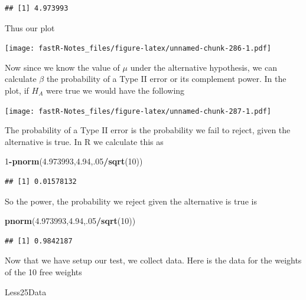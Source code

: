 \documentclass[]{book}
\newenvironment{Shaded}{\begin{snugshade}}{\end{snugshade}}
\newcommand{\KeywordTok}[1]{\textcolor[rgb]{0.13,0.29,0.53}{\textbf{#1}}}
\newcommand{\DecValTok}[1]{\textcolor[rgb]{0.00,0.00,0.81}{#1}}
\newcommand{\FloatTok}[1]{\textcolor[rgb]{0.00,0.00,0.81}{#1}}
\newcommand{\OperatorTok}[1]{\textcolor[rgb]{0.81,0.36,0.00}{\textbf{#1}}}
\newcommand{\NormalTok}[1]{#1}
\theoremstyle{definition}
\theoremstyle{definition}
\theoremstyle{definition}
\theoremstyle{remark}
\begin{document}
\begin{verbatim}
## [1] 4.973993
\end{verbatim}

Thus our plot

\texttt{[image: fastR-Notes\_files/figure-latex/unnamed-chunk-286-1.pdf]}

Now since we know the value of \(\mu\) under the alternative hypothesis,
we can calculate \(\beta\) the probability of a Type II error or its
complement power. In the plot, if \(H_{A}\) were true we would have the
following

\texttt{[image: fastR-Notes\_files/figure-latex/unnamed-chunk-287-1.pdf]}

The probability of a Type II error is the probability we fail to reject,
given the alternative is true. In R we calculate this as

\begin{Shaded}
\begin{Highlighting}[]
\DecValTok{1}\OperatorTok{-}\KeywordTok{pnorm}\NormalTok{(}\FloatTok{4.973993}\NormalTok{,}\FloatTok{4.94}\NormalTok{,.}\DecValTok{05}\OperatorTok{/}\KeywordTok{sqrt}\NormalTok{(}\DecValTok{10}\NormalTok{))}
\end{Highlighting}
\end{Shaded}

\begin{verbatim}
## [1] 0.01578132
\end{verbatim}

So the power, the probability we reject given the alternative is true is

\begin{Shaded}
\begin{Highlighting}[]
\KeywordTok{pnorm}\NormalTok{(}\FloatTok{4.973993}\NormalTok{,}\FloatTok{4.94}\NormalTok{,.}\DecValTok{05}\OperatorTok{/}\KeywordTok{sqrt}\NormalTok{(}\DecValTok{10}\NormalTok{))}
\end{Highlighting}
\end{Shaded}

\begin{verbatim}
## [1] 0.9842187
\end{verbatim}

Now that we have setup our test, we collect data. Here is the data for
the weights of the 10 free weights

\begin{Shaded}
\begin{Highlighting}[]
\NormalTok{Less25Data}
\end{Highlighting}
\end{Shaded}
\end{document}
